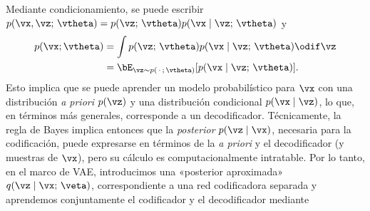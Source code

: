 \documentclass[../../book-main_es.tex]{subfiles}
\begin{document}
Mediante condicionamiento, se puede escribir $p(\vx, \vz ;\, \vtheta)
= p(\vz;\, \vtheta) p(\vx \mid \vz;\, \vtheta)$ y
\begin{align*}
    p(\vx; \vtheta) &= \int p(\vz;\, \vtheta) p(\vx \mid \vz;\,
    \vtheta) \odif \vz
    \\
    &=
    \bE_{\vz \sim p(\,\cdot\,;\, \vtheta)}[ p(\vx \mid \vz;\, \vtheta) ].
\end{align*}
%
Esto implica que se puede aprender un modelo probabilístico para $\vx$ con
una distribución \textit{a priori} $p(\vz)$ y una distribución condicional $p(\vx \mid \vz)$,
lo que, en términos más generales, corresponde a un decodificador. Técnicamente,
la regla de Bayes implica entonces que la \textit{posterior} $p(\vz \mid \vx)$, necesaria para la codificación, 
puede expresarse en términos de la \textit{a priori} y el decodificador (y muestras de $\vx$), 
pero su cálculo es computacionalmente intratable. Por lo tanto,
en el marco de VAE, introducimos una «posterior aproximada»
$q(\vz \mid \vx;\, \veta)$, correspondiente
a una red codificadora separada y aprendemos conjuntamente el codificador y el decodificador mediante
\end{document}
